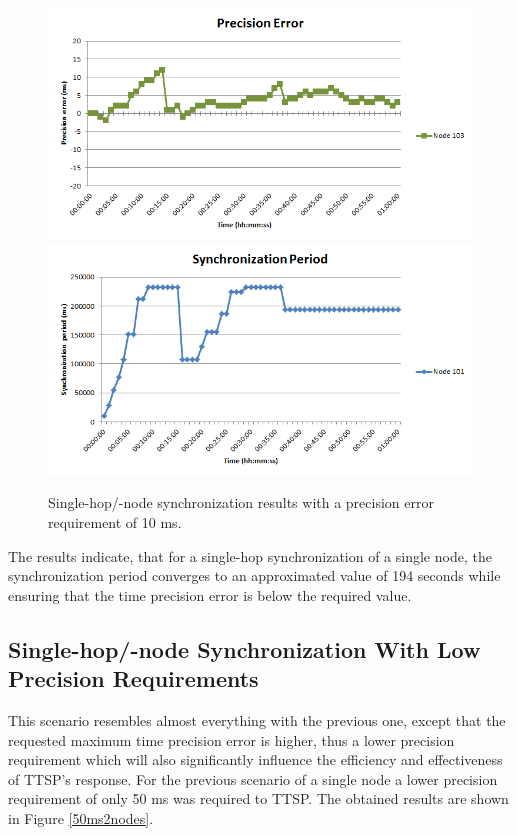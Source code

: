 \begin{figure}[!htb]
\begin{center}
\includegraphics[scale=0.4]{./images/09-ttsp-10ms2nodes-error.png}
\includegraphics[scale=0.4]{./images/10-ttsp-10ms2nodes-period.png}
\end{center}
\caption{Single-hop/-node synchronization results with a precision error requirement of 10 ms.}
\label{10ms2nodes}
\end{figure}

The results indicate, that for a single-hop synchronization of a single node, the synchronization period converges to an approximated value of 194 seconds while ensuring that the time precision error is below the required value.

\subsection{Single-hop/-node Synchronization With Low Precision Requirements}
This scenario resembles almost everything with the previous one, except that the requested maximum time precision error is higher, thus a lower precision requirement which will also significantly influence the efficiency and effectiveness of TTSP's response. For the previous scenario of a single node a lower precision requirement of only 50 ms was required to TTSP. The obtained results are shown in Figure \ref{50ms2nodes}.

